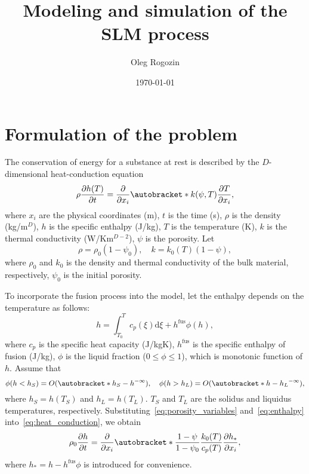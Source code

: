 \documentclass{article}
\title{Modeling and simulation of the SLM process}
\date{\today}
\author{Oleg Rogozin}
\newcommand{\pder}[2][]{\frac{\partial#1}{\partial#2}}
\DeclarePairedDelimiter\autobracket()       %
\newcommand{\br}[1]{\autobracket*{#1}}
\newcommand{\dd}{\mathrm{d}}
\newcommand{\OO}[1]{O(#1)}
\newcommand{\fusion}[1]{{#1}^\mathrm{fus}}
\begin{document}
\maketitle
\tableofcontents

\section{Formulation of the problem}

The conservation of energy for a substance at rest is described by the \(D\)-dimensional heat-conduction equation
\begin{equation}\label{eq:heat_conduction}
	\rho\pder[h(T)]{t} = \pder{x_i}\br{ k(\psi,T)\pder[T]{x_i} },
\end{equation}
where \(x_i\) are the physical coordinates (\si{m}), \(t\) is the time (\si{s}),
\(\rho\) is the density (\si{kg/m}\(^D\)), \(h\) is the specific enthalpy (\si{J/kg}),
\(T\) is the temperature (\si{\K}), \(k\) is the thermal conductivity (\si{W/Km}\(^{D-2}\)),
\(\psi\) is the porosity. Let
\begin{equation}\label{eq:porosity_variables}
	\rho = \rho_0(1-\psi_0), \quad k = k_0(T)(1-\psi),
\end{equation}
where \(\rho_0\) and \(k_0\) is the density and thermal conductivity of the bulk material, respectively,
\(\psi_0\) is the initial porosity.

To incorporate the fusion process into the model, let the enthalpy depends on the temperature as follows:
\begin{equation}\label{eq:enthalpy}
	h = \int_{T_0}^T c_p(\xi)\dd\xi + \fusion{h}\phi(h),
\end{equation}
where \(c_p\) is the specific heat capacity (\si{J/kgK}), \(\fusion{h}\) is the specific enthalpy of fusion (\si{J/kg}),
\(\phi\) is the liquid fraction (\(0 \leq \phi \leq 1\)), which is monotonic function of \(h\).
Assume that
\begin{equation}\label{eq:liquid_fraction}
	\phi(h<h_S) = \OO{\br{h_S-h}^{-\infty}}, \quad \phi(h>h_L) = \OO{\br{h-h_L}^{-\infty}},
\end{equation}
where \(h_S = h(T_S)\) and \(h_L = h(T_L)\).
\(T_S\) and \(T_L\) are the solidus and liquidus temperatures, respectively.
Substituting~\eqref{eq:porosity_variables} and~\eqref{eq:enthalpy} into~\eqref{eq:heat_conduction}, we obtain
\begin{equation}\label{eq:heat_conduction2}
	\rho_0\pder[h]{t} = \pder{x_i}\br{ \frac{1-\psi}{1-\psi_0} \frac{k_0(T)}{c_p(T)}\pder[h_*]{x_i} },
\end{equation}
where \(h_* = h - \fusion{h}\phi\) is introduced for convenience.
\end{document}
